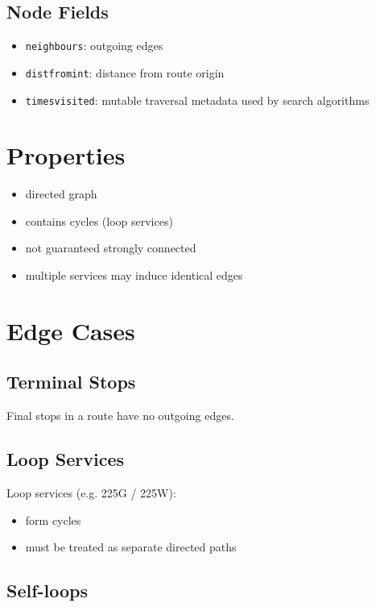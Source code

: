 \documentclass[11pt,a4paper]{article}
\begin{document}
\subsection{Node Fields}

\begin{itemize}
    \item \texttt{neighbours}: outgoing edges
    \item \texttt{distfromint}: distance from route origin
    \item \texttt{timesvisited}: mutable traversal metadata used by search algorithms
\end{itemize}

\section{Properties}

\begin{itemize}
    \item directed graph
    \item contains cycles (loop services)
    \item not guaranteed strongly connected
    \item multiple services may induce identical edges
\end{itemize}

\section{Edge Cases}

\subsection{Terminal Stops}

Final stops in a route have no outgoing edges.

\subsection{Loop Services}

Loop services (e.g. 225G / 225W):

\begin{itemize}
    \item form cycles
    \item must be treated as separate directed paths
\end{itemize}

\subsection{Self-loops}
\end{document}
